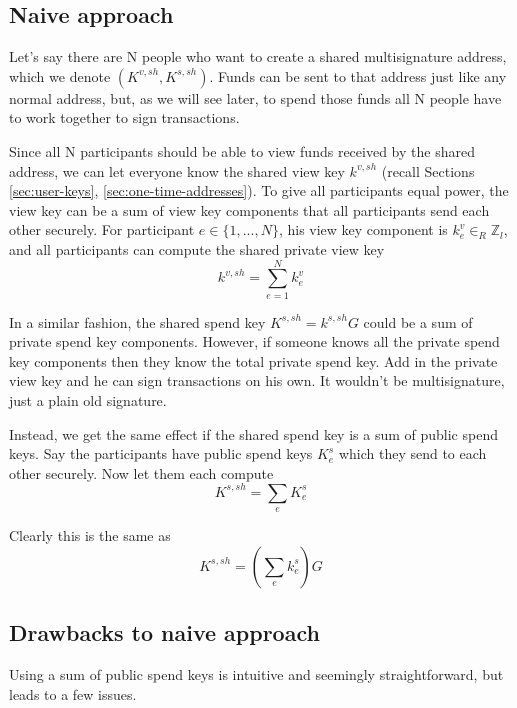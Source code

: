 \subsection{Naive approach}
\label{sec:naive-key-aggregation}

Let's say there are N people who want to create a shared multisignature address, which we denote $(K^{v,sh},K^{s,sh})$. Funds can be sent to that address just like any normal address, but, as we will see later, to spend those funds all N people have to work together to sign transactions.

Since all N participants should be able to view funds received by the shared address, we can let everyone know the shared view key $k^{v,sh}$ (recall Sections \ref{sec:user-keys}, \ref{sec:one-time-addresses}). To give all participants equal power, the view key can be a sum of view key components that all participants send each other securely. For participant $e \in \{1,...,N\}$, his view key component is $k^{v}_e \in_R \mathbb{Z}_l$, and all participants can compute the shared private view key
\[ k^{v,sh} = \sum^{N}_{e=1} k^{v}_e \]

In a similar fashion, the shared spend key $K^{s,sh} = k^{s,sh} G$ could be a sum of private spend key components. However, if someone knows all the private spend key components then they know the total private spend key. Add in the private view key and he can sign transactions on his own. It wouldn't be multisignature, just a plain old signature.

Instead, we get the same effect if the shared spend key is a sum of public spend keys. Say the participants have public spend keys $K^{s}_e$ which they send to each other securely. Now let them each compute
\[ K^{s,sh} = \sum_e K^{s}_e \]

Clearly this is the same as 
\[ K^{s,sh} = (\sum_e k^{s}_e) G\]


\subsection{Drawbacks to naive approach}
    
Using a sum of public spend keys is intuitive and seemingly straightforward, but leads to a few issues.

